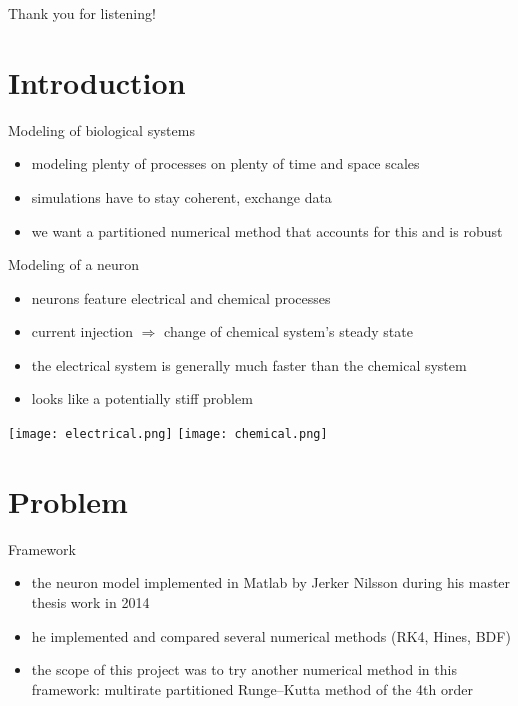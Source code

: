 \documentclass[11pt]{beamer}
\begin{document}
\begin{frame}[plain]
      Thank you for listening!
\end{frame}












\iffalse
\section{Introduction}
\begin{frame}{Modeling of biological systems}
\begin{itemize}
\item modeling plenty of processes on plenty of time and space scales
\item simulations have to stay coherent, exchange data
\item we want a partitioned numerical method that accounts for this and is robust
\end{itemize}

\end{frame}
\begin{frame}{Modeling of a neuron}
\begin{itemize}
\item neurons feature electrical and chemical processes
\item current injection $\Rightarrow$ change of chemical system's steady state
\item the electrical system is generally much faster than the chemical system
\item looks like a potentially stiff problem
\end{itemize}
\texttt{[image: electrical.png]} 
\texttt{[image: chemical.png]} 

\end{frame}

\section{Problem}
\begin{frame}{Framework}
\begin{itemize}
\item the neuron model implemented in Matlab by Jerker Nilsson during his master thesis work in 2014
\item he implemented and compared several numerical methods (RK4, Hines, BDF)
\item the scope of this project was to try another numerical method in this framework: multirate partitioned Runge–Kutta method of the 4th order
\end{itemize}
\end{frame}
\end{document}
